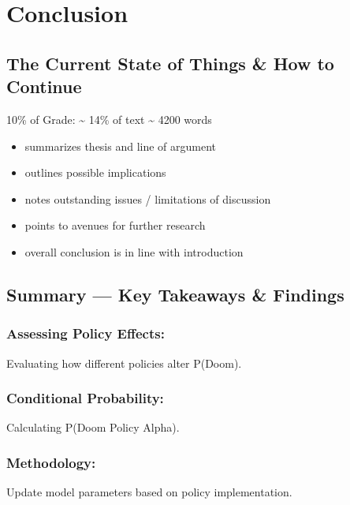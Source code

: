 \documentclass[
  letterpaper,
]{book}
\providecommand{\tightlist}{%
  \setlength{\itemsep}{0pt}\setlength{\parskip}{0pt}}
\begin{document}

\chapter{Conclusion}\label{conclusion}

\section{The Current State of Things \& How to
Continue}\label{the-current-state-of-things-how-to-continue}

10\% of Grade: \textasciitilde{} 14\% of text \textasciitilde{} 4200
words

\begin{itemize}
\tightlist
\item
  summarizes thesis and line of argument
\item
  outlines possible implications
\item
  notes outstanding issues / limitations of discussion
\item
  points to avenues for further research
\item
  overall conclusion is in line with introduction
\end{itemize}

\section{Summary --- Key Takeaways \&
Findings}\label{summary-key-takeaways-findings}

\subsection{Assessing Policy Effects:}\label{assessing-policy-effects}

Evaluating how different policies alter P(Doom).

\subsection{Conditional Probability:}\label{conditional-probability}

Calculating P(Doom \textbar{} Policy Alpha).

\subsection{Methodology:}\label{methodology-1}

Update model parameters based on policy implementation.
\end{document}

